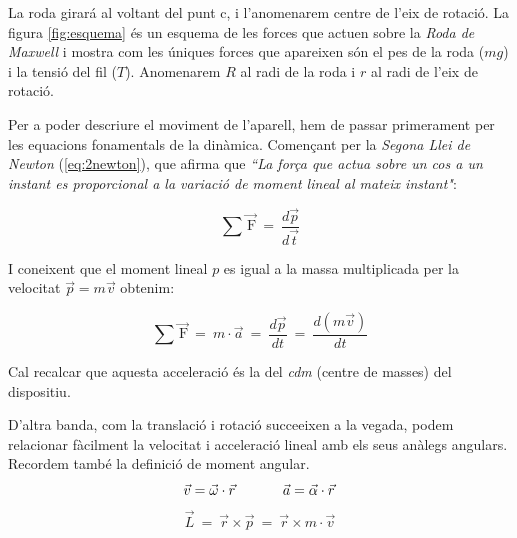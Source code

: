 \documentclass[11pt]{article}
\newcommand\upvec[1]{\!\vec{\,\mathrm{#1}}}
\begin{document}
        \vspace{0.4cm}La roda girará al voltant del punt c, i l'anomenarem centre de l'eix de rotació. La figura \ref{fig:esquema} és un esquema de les forces que actuen sobre la \textit{Roda de Maxwell} i mostra com les úniques forces que apareixen són el pes de la roda ($mg$) i la tensió del fil ($T$). Anomenarem $R$ al radi de la roda i $r$ al radi de l'eix de rotació.
    
        \vspace{0.4cm}Per a poder descriure el moviment de l'aparell, hem de passar primerament per les equacions fonamentals de la dinàmica. Començant per la \textit{Segona Llei de Newton} (\ref{eq:2newton}), que afirma que \textit{``La força que actua sobre un cos a un instant es proporcional a la variació de moment lineal al mateix instant"}:
    
        \begin{equation}
            \sum \upvec{F}\ =\ \frac{d\vec{p}}{d\vec{t}}
            \label{eq:2newton}
        \end{equation}
    
        \vspace{0.1cm}I coneixent que el moment lineal $p$ es igual a la massa multiplicada per la velocitat $\vec{p}=m\vec{v}$ obtenim:
    
        \begin{equation}
            \sum \upvec{F}\ =\ m\cdot\vec{a}\ =\ \frac{d\vec{p}}{dt}\ =\ \frac{d\left(m\vec{v}\right)}{dt}
            \label{eq:2newton}
        \end{equation}
    
        \vspace{0.1cm}Cal recalcar que aquesta acceleració és la del \textit{cdm} (centre de masses) del dispositiu.
        
    \clearpage
    
        D'altra banda, com la translació i rotació succeeixen a la vegada, podem relacionar fàcilment la velocitat i acceleració lineal amb els seus anàlegs angulars. Recordem també la definició de moment angular.
        \vspace{-0.2cm}
        \begin{equation}
            \vec{v}=\vec{\omega}\cdot\Vec{r}\hspace{1.2cm}\vec{a}=\vec{\alpha}\cdot\vec{r}
            \label{eq:angular}
        \end{equation}
        \begin{equation}
            \vec{L}\ =\ \vec{r}\times\vec{p}\ =\ \vec{r}\times m\cdot\vec{v}
            \label{eq:momAngular}
        \end{equation}
    
\end{document}

